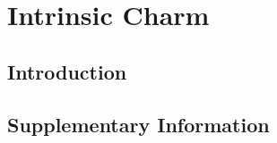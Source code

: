 
\chapter{Intrinsic Charm}
\label{ch:ic}
\minitoc
\adjustmtc

\section{Introduction}
\label{sec:ic/intro}


\section{Supplementary Information}
\label{sec:ic/supplementary}

